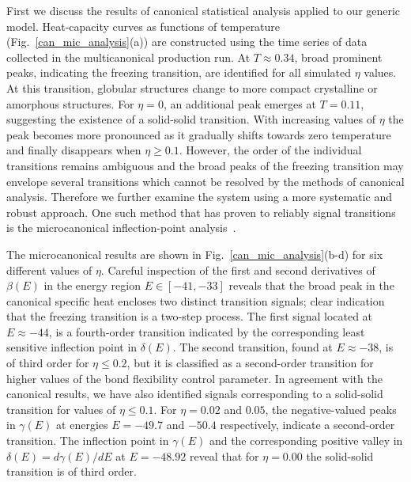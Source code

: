 \documentclass[12pt]{report}
\begin{document}
First we discuss the results of canonical statistical analysis applied to
our generic model. Heat-capacity curves as functions of temperature
(Fig.~\ref{can_mic_analysis}(a)) are constructed using the time series
of data collected in the multicanonical production run. At $T \approx
0.34$, broad prominent peaks, indicating the freezing transition, are
identified for all simulated $\eta$ values. At this transition, globular
structures change to more compact crystalline or amorphous structures.
For $\eta = 0$, an additional peak emerges at $T=0.11$, suggesting the
existence of a solid-solid transition. With increasing values of $\eta$
the peak becomes more pronounced as it gradually shifts towards zero
temperature and finally disappears when $\eta \geq 0.1$. However, the
order of the individual transitions remains ambiguous and the broad
peaks of the freezing transition may envelope several transitions which
cannot be resolved by the methods of canonical analysis. Therefore we
further examine the system using a more systematic 
and robust approach. One such method that has proven to reliably
signal transitions is the microcanonical inflection-point
analysis~\cite{Schnabel2011}.

The microcanonical results are shown in Fig.~\ref{can_mic_analysis}(b-d)
for six different values of $\eta$. Careful inspection of the first and
second derivatives of $\beta(E)$ in the energy region $E\in[-41,-33]$
reveals that the broad peak in the canonical specific heat encloses two
distinct transition signals; clear indication that the freezing
transition is a two-step process. The first signal located at $E\approx
-44$, is a fourth-order transition indicated by the corresponding least
sensitive inflection point in
$\delta(E)$. The second transition, found at $E\approx -38$, is of
third order for $\eta \leq 0.2$, but it is classified as a second-order
transition for higher values of the bond flexibility control parameter.
In agreement with the canonical results, we have also identified signals
corresponding to a solid-solid transition for values of $\eta \leq 0.1$.
For $\eta=0.02$ and $0.05$, the negative-valued peaks in $\gamma(E)$ at
energies $E=-49.7$ and $-50.4$ respectively, indicate a second-order
transition. The inflection point in $\gamma(E)$ and the corresponding
positive valley in $\delta(E)=d \gamma(E)/d E$ at $E=-48.92$ reveal that
for $\eta = 0.00$ the solid-solid transition is of third order. 
\end{document}
